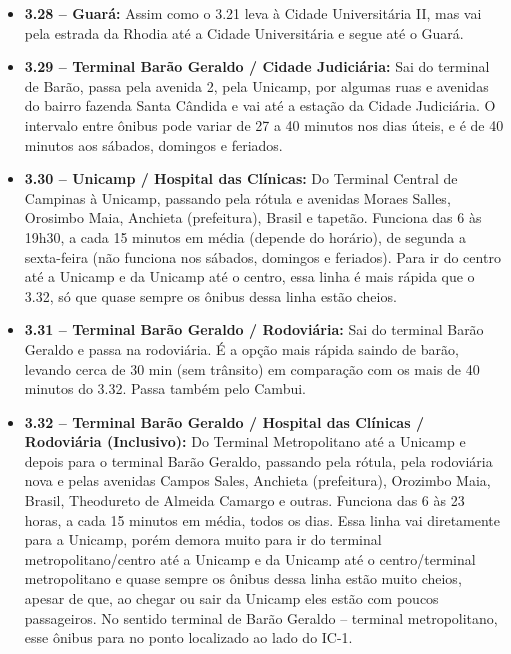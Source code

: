 \begin{itemize}
\item  \textbf{3.28 -- Guará:} Assim como o 3.21 leva à Cidade Universitária II,
       mas vai pela estrada da Rhodia até a Cidade Universitária e segue até
       o Guará.

\item  \textbf{3.29 -- Terminal Barão Geraldo / Cidade Judiciária:} Sai do
       terminal de Barão, passa pela avenida 2, pela Unicamp, por algumas ruas
       e avenidas do bairro fazenda Santa Cândida e vai até a estação da Cidade
       Judiciária. O intervalo entre ônibus pode variar de 27 a 40 minutos nos dias
       úteis, e é de 40 minutos aos sábados, domingos e feriados.

\item  \textbf{3.30 -- Unicamp / Hospital das Clínicas:} Do Terminal Central de
       Campinas à Unicamp, passando pela rótula e avenidas Moraes Salles, Orosimbo
       Maia, Anchieta (prefeitura), Brasil e tapetão. Funciona das 6 às 19h30,
       a cada 15 minutos em média (depende do horário), de segunda a sexta-feira
       (não funciona nos sábados, domingos e feriados). Para ir do centro até
       a Unicamp e da Unicamp até o centro, essa linha é mais rápida que o 3.32, só
       que quase sempre os ônibus dessa linha estão cheios.

\item  \textbf{3.31 -- Terminal Barão Geraldo / Rodoviária:} Sai do terminal
       Barão Geraldo e passa na rodoviária. É a opção mais rápida saindo de barão,
       levando cerca de 30 min (sem trânsito) em comparação com os mais de 40
       minutos do 3.32. Passa também pelo Cambui.

\item  \textbf{3.32 -- Terminal Barão Geraldo / Hospital das Clínicas
        / Rodoviária (Inclusivo):} Do Terminal Metropolitano até a Unicamp
       e depois para o terminal Barão Geraldo, passando pela rótula, pela
       rodoviária nova e pelas avenidas Campos Sales, Anchieta (prefeitura),
       Orozimbo Maia, Brasil, Theodureto de Almeida Camargo e outras. Funciona das
       6 às 23 horas, a cada 15 minutos em média, todos os dias. Essa linha vai
       diretamente para a Unicamp, porém demora muito para ir do terminal
       metropolitano/centro até a Unicamp e da Unicamp até o centro/terminal
       metropolitano e quase sempre os ônibus dessa linha estão muito cheios,
       apesar de que, ao chegar ou sair da Unicamp eles estão com poucos
       passageiros. No sentido terminal de Barão Geraldo -- terminal metropolitano,
       esse ônibus para no ponto localizado ao lado do IC-1.


\end{itemize}
